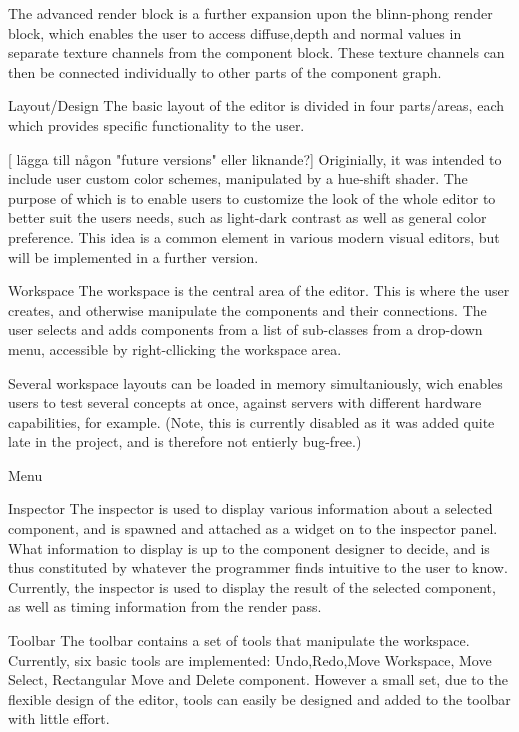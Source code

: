 The advanced render block is a further expansion upon the blinn-phong render block, which enables the user to access diffuse,depth  and normal values in separate texture channels from the component block. These texture channels can then be connected individually to other parts of the component graph. 

Layout/Design
The basic layout of the editor is divided in four parts/areas, each which provides specific functionality to the user. 

[ lägga till någon "future versions" eller liknande?]
Originially, it was intended to include user custom color schemes, manipulated by a hue-shift shader. The purpose of which is to enable users to customize the look of the whole editor to better suit the users needs, such as light-dark contrast as well as general color preference. This idea is a common element in various modern visual editors, but will be implemented in a further version. 

Workspace
The workspace is the central area of the editor. This is where the user creates, and otherwise manipulate the components and their connections. The user selects and adds components from a list of sub-classes from a drop-down menu, accessible by right-cllicking the workspace area. 

Several workspace layouts can be loaded in memory simultaniously, wich enables users to test several concepts at once, against servers with different hardware capabilities, for example. (Note, this is currently disabled as it was added quite late in the project, and is therefore not entierly bug-free.)

Menu

Inspector
The inspector is used to display various information about a selected component, and is spawned and attached as a widget on to the inspector panel. What information to display is up to the component designer to decide, and is thus constituted by whatever the programmer finds intuitive to the user to know. Currently, the inspector is used to display the result of the selected component, as well as timing information from the render pass.

Toolbar
The toolbar contains a set of tools that manipulate the workspace. Currently, six basic tools are implemented: Undo,Redo,Move Workspace, Move Select, Rectangular Move and Delete component. However a small set, due to the flexible design of the editor, tools can easily be designed and added to the toolbar with little effort. 
 